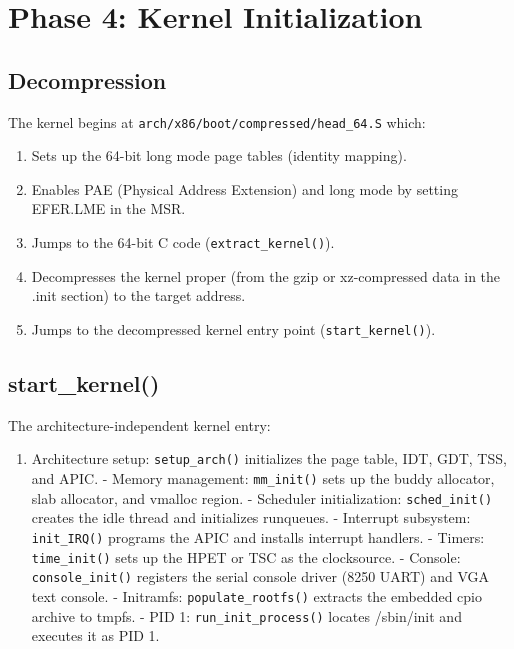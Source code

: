 \section{Phase 4: Kernel Initialization}

\subsection{Decompression}

The kernel begins at \texttt{arch/x86/boot/compressed/head\_64.S} which:

\begin{enumerate}[nosep]
  \item Sets up the 64-bit long mode page tables (identity mapping).
  \item Enables PAE (Physical Address Extension) and long mode by
        setting EFER.LME in the MSR.
  \item Jumps to the 64-bit C code (\texttt{extract\_kernel()}).
  \item Decompresses the kernel proper (from the gzip or xz-compressed
        data in the .init section) to the target address.
  \item Jumps to the decompressed kernel entry point
        (\texttt{start\_kernel()}).
\end{enumerate}

\subsection{start\_kernel()}

The architecture-independent kernel entry:

\begin{enumerate}[nosep]
  \item Architecture setup: \texttt{setup\_arch()} initializes the page
        table, IDT, GDT, TSS, and APIC.
  - Memory management: \texttt{mm\_init()} sets up the buddy allocator,
        slab allocator, and vmalloc region.
  - Scheduler initialization: \texttt{sched\_init()} creates the idle
        thread and initializes runqueues.
  - Interrupt subsystem: \texttt{init\_IRQ()} programs the APIC and
        installs interrupt handlers.
  - Timers: \texttt{time\_init()} sets up the HPET or TSC as the
        clocksource.
  - Console: \texttt{console\_init()} registers the serial console
        driver (8250 UART) and VGA text console.
  - Initramfs: \texttt{populate\_rootfs()} extracts the embedded cpio
        archive to tmpfs.
  - PID 1: \texttt{run\_init\_process()} locates /sbin/init and executes
        it as PID 1.
\end{enumerate}

